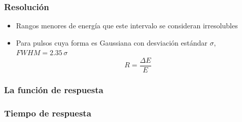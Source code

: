 \documentclass{beamer}
\begin{document}
\begin{frame}
\frametitle{Resolución}
\begin{alertblock}{}
\begin{itemize}[<+->]
\item Rangos menores de energía que este intervalo se consideran irresolubles 
\item Para pulsos cuya forma es Gaussiana con desviación estándar $\sigma$, $FWHM = 2.35\,\sigma$
$$R = \frac{\Delta E}{E}$$
\end{itemize}
\end{alertblock}
\begin{center}
\end{center}
\end{frame} 

\subsubsection{La función de respuesta}

\subsubsection{Tiempo de respuesta}
\end{document}
